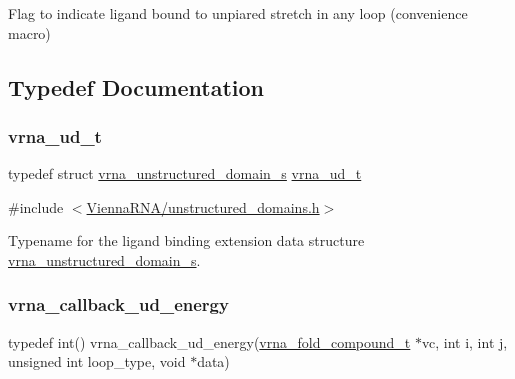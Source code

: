 Flag to indicate ligand bound to unpiared stretch in any loop (convenience macro) 



\subsection{Typedef Documentation}
\mbox{\label{group__domains__up_ga0009117b14d29143e8b18ab891f48c2d}} 
\subsubsection{\texorpdfstring{vrna\+\_\+ud\+\_\+t}{vrna\_ud\_t}}
{\footnotesize\ttfamily typedef struct \mbox{\hyperlink{group__domains__up_structvrna__unstructured__domain__s}{vrna\+\_\+unstructured\+\_\+domain\+\_\+s}} \mbox{\hyperlink{group__domains__up_ga0009117b14d29143e8b18ab891f48c2d}{vrna\+\_\+ud\+\_\+t}}}



{\ttfamily \#include $<$\mbox{\hyperlink{unstructured__domains_8h}{Vienna\+R\+N\+A/unstructured\+\_\+domains.\+h}}$>$}



Typename for the ligand binding extension data structure \mbox{\hyperlink{group__domains__up_structvrna__unstructured__domain__s}{vrna\+\_\+unstructured\+\_\+domain\+\_\+s}}. 

\mbox{\label{group__domains__up_ga75825c57d0bfde4ae4f95c044260c5c3}} 
\subsubsection{\texorpdfstring{vrna\+\_\+callback\+\_\+ud\+\_\+energy}{vrna\_callback\_ud\_energy}}
{\footnotesize\ttfamily typedef int() vrna\+\_\+callback\+\_\+ud\+\_\+energy(\mbox{\hyperlink{group__fold__compound_ga1b0cef17fd40466cef5968eaeeff6166}{vrna\+\_\+fold\+\_\+compound\+\_\+t}} $\ast$vc, int i, int j, unsigned int loop\+\_\+type, void $\ast$data)}



